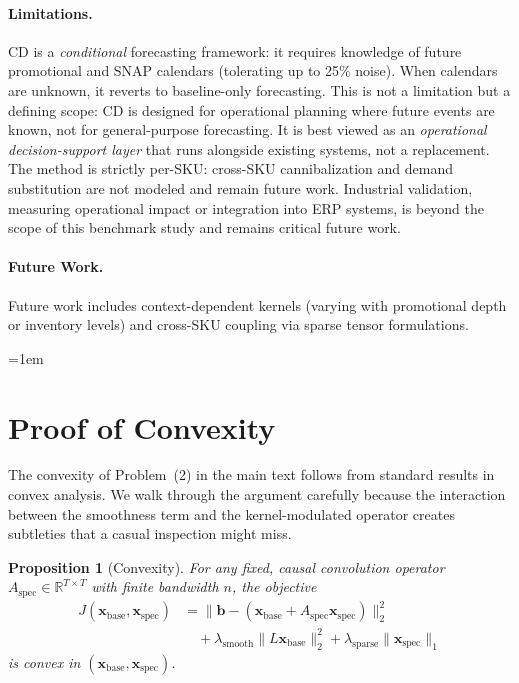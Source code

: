 \documentclass[10pt]{article} %
\theoremstyle{plain}
\newtheorem{proposition}{Proposition}
\theoremstyle{definition}
\newcommand{\R}{\mathbb{R}}
\newcommand{\xbase}{\mathbf{x}_{\text{base}}}
\newcommand{\xspec}{\mathbf{x}_{\text{spec}}}
\newcommand{\Aspec}{A_{\text{spec}}}
\newcommand{\bvec}{\mathbf{b}}
\begin{document}
\paragraph{Limitations.}
CD is a \emph{conditional} forecasting framework: it requires knowledge of future promotional and SNAP calendars (tolerating up to 25\% noise). When calendars are unknown, it reverts to baseline-only forecasting. This is not a limitation but a defining scope: CD is designed for operational planning where future events are known, not for general-purpose forecasting. It is best viewed as an \emph{operational decision-support layer} that runs alongside existing systems, not a replacement. The method is strictly per-SKU: cross-SKU cannibalization and demand substitution are not modeled and remain future work. Industrial validation, measuring operational impact or integration into ERP systems, is beyond the scope of this benchmark study and remains critical future work.

\paragraph{Future Work.}
Future work includes context-dependent kernels (varying with promotional depth or inventory levels) and cross-SKU coupling via sparse tensor formulations.






\appendix
{}
\emergencystretch=1em

\section{Proof of Convexity}
\label{app:convexity}

The convexity of Problem~(2) in the main text follows from standard results in convex analysis. We walk through the argument carefully because the interaction between the smoothness term and the kernel-modulated operator creates subtleties that a casual inspection might miss.

\begin{proposition}[Convexity]
For any fixed, causal convolution operator $\Aspec \in \R^{T \times T}$ with finite bandwidth $n$, the objective
\begin{equation}
\begin{split}
J(\xbase, \xspec) &= \|\bvec - (\xbase + \Aspec \xspec)\|_2^2 \\
&\quad + \lambda_{\text{smooth}} \|L \xbase\|_2^2 + \lambda_{\text{sparse}} \|\xspec\|_1
\end{split}
\end{equation}
is convex in $(\xbase, \xspec)$.
\end{proposition}
\end{document}
